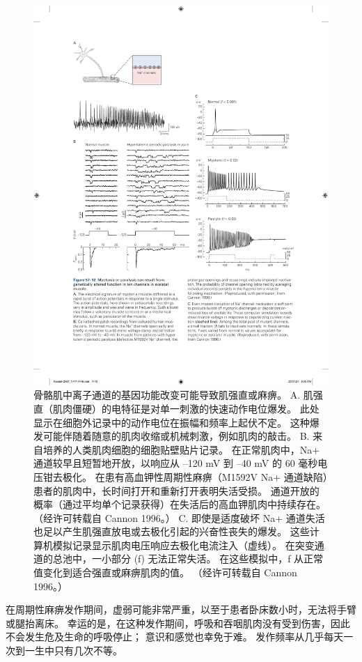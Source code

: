 \begin{figure}[htbp]
	\centering
	\includegraphics[width=0.95\linewidth]{chap57/fig_57_12}
	\caption{骨骼肌中离子通道的基因功能改变可能导致肌强直或麻痹。 A. 肌强直（肌肉僵硬）的电特征是对单一刺激的快速动作电位爆发。 此处显示在细胞外记录中的动作电位在振幅和频率上起伏不定。 这种爆发可能伴随着随意的肌肉收缩或机械刺激，例如肌肉的敲击。 B. 来自培养的人类肌肉细胞的细胞贴壁贴片记录。 在正常肌肉中，Na+ 通道较早且短暂地开放，以响应从 –120 mV 到 –40 mV 的 60 毫秒电压钳去极化。 在患有高血钾性周期性麻痹（M1592V Na+ 通道缺陷）患者的肌肉中，长时间打开和重新打开表明失活受损。 通道开放的概率（通过平均单个记录获得）在失活后的高血钾肌肉中持续存在。 （经许可转载自 Cannon 1996。） C. 即使是适度破坏 Na+ 通道失活也足以产生肌强直放电或去极化引起的兴奋性丧失的爆发。 这些计算机模拟记录显示肌肉电压响应去极化电流注入（虚线）。 在突变通道的总池中，一小部分 (f) 无法正常失活。 在这些模拟中，f 从正常值变化到适合强直或麻痹肌肉的值。 （经许可转载自 Cannon 1996。）}
	\label{fig:57_12}
\end{figure}

在周期性麻痹发作期间，虚弱可能非常严重，以至于患者卧床数小时，无法将手臂或腿抬离床。 幸运的是，在这种发作期间，呼吸和吞咽肌肉没有受到伤害，因此不会发生危及生命的呼吸停止； 意识和感觉也幸免于难。 发作频率从几乎每天一次到一生中只有几次不等。


